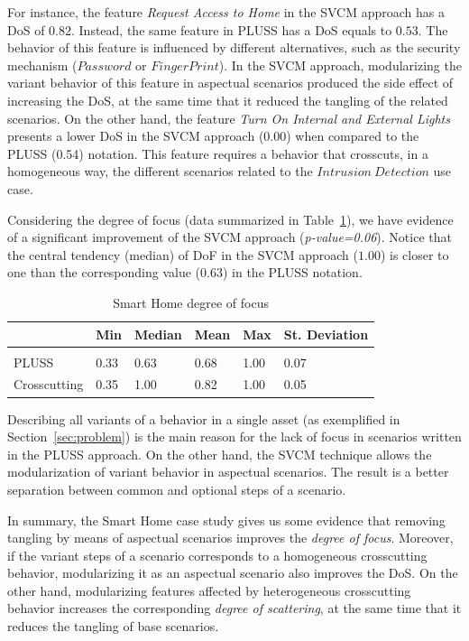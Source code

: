 \documentclass{acm_proc_article-sp}
\begin{document}
For instance, the feature \emph{Request Access to Home} in the SVCM
approach has a DoS of $0.82$. Instead, the same feature in PLUSS has a
DoS equals to $0.53$. The behavior of this feature is influenced by different
alternatives, such as the security mechanism ($Password$ or $Finger Print$).
In the SVCM approach, modularizing the variant behavior of this feature in
aspectual scenarios produced the side effect of increasing the DoS, at the same time that it reduced the tangling of the related scenarios.
On the other hand, the feature \emph{Turn On Internal and External Lights}
presents a lower DoS in the SVCM approach (0.00) when compared to the
PLUSS (0.54) notation. This feature requires a behavior that crosscuts, in a
homogeneous way, the different scenarios related to the $Intrusion\ Detection$
use case.

Considering the degree of focus (data summarized in Table~\ref{tab:sh-dof}), we
have evidence of a significant improvement of the SVCM approach
(\emph{p-value=0.06}). Notice that the central tendency (median) of DoF in the
SVCM approach ($1.00$) is closer to one than the corresponding value
($0.63$) in the PLUSS notation.

\begin{table}[htb] \centering
\caption{Smart Home degree of focus}
\label{tab:sh-dof}
\begin{small}
\begin{tabular}{llllll} \hline
					& Min 	& Median 	& Mean 	& Max 	& St. Deviation \\ \hline \\
	PLUSS			& 0.33  & 0.63   	& 0.68  & 1.00 	& 0.07 			\\
	Crosscutting	& 0.35  & 1.00   	& 0.82 	& 1.00 	& 0.05			\\ \hline	
\end{tabular}
\end{small}
\end{table}

Describing all variants of a behavior in a single asset
(as exemplified in Section~\ref{sec:problem}) is the main reason for the lack of
focus in scenarios written in the PLUSS approach. On the other hand, the SVCM technique
allows the modularization of variant behavior in aspectual scenarios. The result
is a better separation between common and optional steps of a scenario.

In summary, the Smart Home case study gives us some evidence that removing tangling by
means of aspectual scenarios improves the \emph{degree of focus}. Moreover, if
the variant steps of a scenario corresponds to a homogeneous crosscutting
behavior, modularizing it as an aspectual scenario also improves the DoS. On the
other hand, modularizing features affected by heterogeneous crosscutting
behavior increases the corresponding \emph{degree of scattering}, at the same time that it reduces the tangling of base scenarios.
\end{document}

